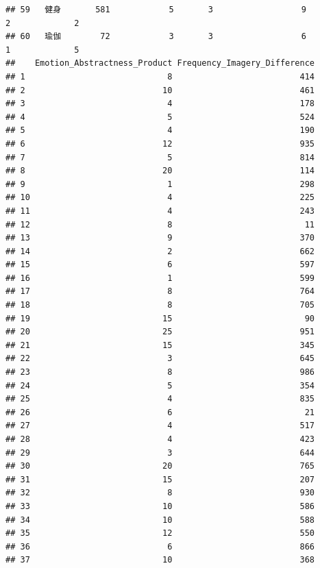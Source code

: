 \documentclass[]{book}
\begin{document}
\begin{verbatim}
## 59   健身       581            5       3                  9          2             2
## 60   瑜伽        72            3       3                  6          1             5
##    Emotion_Abstractness_Product Frequency_Imagery_Difference
## 1                             8                          414
## 2                            10                          461
## 3                             4                          178
## 4                             5                          524
## 5                             4                          190
## 6                            12                          935
## 7                             5                          814
## 8                            20                          114
## 9                             1                          298
## 10                            4                          225
## 11                            4                          243
## 12                            8                           11
## 13                            9                          370
## 14                            2                          662
## 15                            6                          597
## 16                            1                          599
## 17                            8                          764
## 18                            8                          705
## 19                           15                           90
## 20                           25                          951
## 21                           15                          345
## 22                            3                          645
## 23                            8                          986
## 24                            5                          354
## 25                            4                          835
## 26                            6                           21
## 27                            4                          517
## 28                            4                          423
## 29                            3                          644
## 30                           20                          765
## 31                           15                          207
## 32                            8                          930
## 33                           10                          586
## 34                           10                          588
## 35                           12                          550
## 36                            6                          866
## 37                           10                          368

\end{verbatim}
\end{document}
